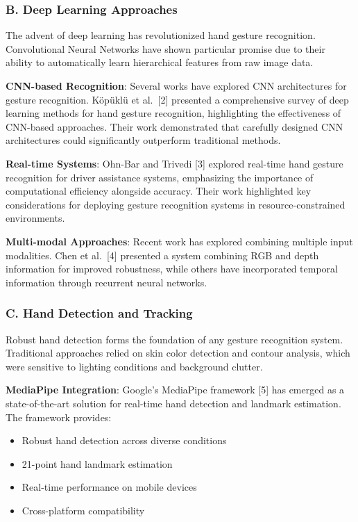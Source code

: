 \documentclass[11pt,a4paper,twoside]{article}
\providecommand{\tightlist}{%
  \setlength{\itemsep}{0pt}\setlength{\parskip}{0pt}}
\begin{document}
\subsubsection{B. Deep Learning
Approaches}\label{b.-deep-learning-approaches}

The advent of deep learning has revolutionized hand gesture recognition.
Convolutional Neural Networks have shown particular promise due to their
ability to automatically learn hierarchical features from raw image
data.

\textbf{CNN-based Recognition}: Several works have explored CNN
architectures for gesture recognition. Köpüklü et al.~{[}2{]} presented
a comprehensive survey of deep learning methods for hand gesture
recognition, highlighting the effectiveness of CNN-based approaches.
Their work demonstrated that carefully designed CNN architectures could
significantly outperform traditional methods.

\textbf{Real-time Systems}: Ohn-Bar and Trivedi {[}3{]} explored
real-time hand gesture recognition for driver assistance systems,
emphasizing the importance of computational efficiency alongside
accuracy. Their work highlighted key considerations for deploying
gesture recognition systems in resource-constrained environments.

\textbf{Multi-modal Approaches}: Recent work has explored combining
multiple input modalities. Chen et al.~{[}4{]} presented a system
combining RGB and depth information for improved robustness, while
others have incorporated temporal information through recurrent neural
networks.

\subsubsection{C. Hand Detection and
Tracking}\label{c.-hand-detection-and-tracking}

Robust hand detection forms the foundation of any gesture recognition
system. Traditional approaches relied on skin color detection and
contour analysis, which were sensitive to lighting conditions and
background clutter.

\textbf{MediaPipe Integration}: Google's MediaPipe framework {[}5{]} has
emerged as a state-of-the-art solution for real-time hand detection and
landmark estimation. The framework provides:

\begin{itemize}
\tightlist
\item
  Robust hand detection across diverse conditions
\item
  21-point hand landmark estimation
\item
  Real-time performance on mobile devices
\item
  Cross-platform compatibility
\end{itemize}
\end{document}
